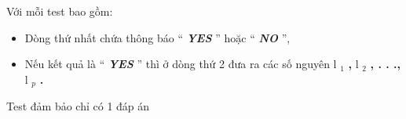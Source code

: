 Với mỗi test bao gồm:
\begin{itemize}
	\item Dòng thứ nhất chứa thông báo “ \textbf{\emph{ YES }} ” hoặc “ \textbf{\emph{ NO }} ”,
	\item Nếu kết quả là “ \textbf{\emph{ YES }} ” thì ở dòng thứ 2 đưa ra các số nguyên l \textbf{$_ 1 $}\textbf{ , } l \textbf{$_ 2 $}\textbf{ , . . ., } l \emph{$_ p $}\textbf{ . }
\end{itemize}

Test đảm bảo chỉ có 1 đáp án